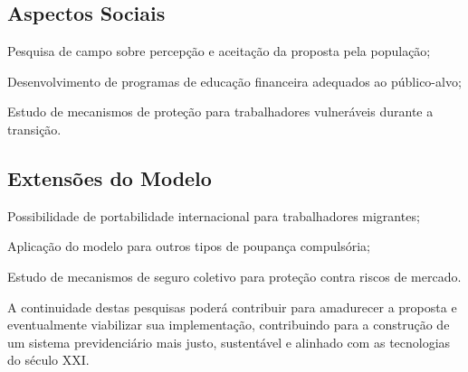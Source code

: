 \subsection{Aspectos Sociais}

\begin{alineas}
    \item Pesquisa de campo sobre percepção e aceitação da proposta pela população;
    \item Desenvolvimento de programas de educação financeira adequados ao público-alvo;
    \item Estudo de mecanismos de proteção para trabalhadores vulneráveis durante a transição.
\end{alineas}

\subsection{Extensões do Modelo}

\begin{alineas}
    \item Possibilidade de portabilidade internacional para trabalhadores migrantes;
    \item Aplicação do modelo para outros tipos de poupança compulsória;
    \item Estudo de mecanismos de seguro coletivo para proteção contra riscos de mercado.
\end{alineas}

A continuidade destas pesquisas poderá contribuir para amadurecer a proposta e eventualmente viabilizar sua implementação, contribuindo para a construção de um sistema previdenciário mais justo, sustentável e alinhado com as tecnologias do século XXI.
